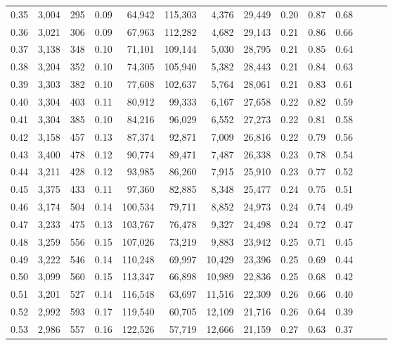 \begin{tabular}{rrrrrrrrrrrrrr}
0.35 &  3,004 &    295 &  0.09 &   64,942 &  115,303 &   4,376 &  29,449 &  0.20 &  0.87 &      0.68 \\
0.36 &  3,021 &    306 &  0.09 &   67,963 &  112,282 &   4,682 &  29,143 &  0.21 &  0.86 &      0.66 \\
0.37 &  3,138 &    348 &  0.10 &   71,101 &  109,144 &   5,030 &  28,795 &  0.21 &  0.85 &      0.64 \\
0.38 &  3,204 &    352 &  0.10 &   74,305 &  105,940 &   5,382 &  28,443 &  0.21 &  0.84 &      0.63 \\
0.39 &  3,303 &    382 &  0.10 &   77,608 &  102,637 &   5,764 &  28,061 &  0.21 &  0.83 &      0.61 \\
0.40 &  3,304 &    403 &  0.11 &   80,912 &   99,333 &   6,167 &  27,658 &  0.22 &  0.82 &      0.59 \\
0.41 &  3,304 &    385 &  0.10 &   84,216 &   96,029 &   6,552 &  27,273 &  0.22 &  0.81 &      0.58 \\
0.42 &  3,158 &    457 &  0.13 &   87,374 &   92,871 &   7,009 &  26,816 &  0.22 &  0.79 &      0.56 \\
0.43 &  3,400 &    478 &  0.12 &   90,774 &   89,471 &   7,487 &  26,338 &  0.23 &  0.78 &      0.54 \\
0.44 &  3,211 &    428 &  0.12 &   93,985 &   86,260 &   7,915 &  25,910 &  0.23 &  0.77 &      0.52 \\
0.45 &  3,375 &    433 &  0.11 &   97,360 &   82,885 &   8,348 &  25,477 &  0.24 &  0.75 &      0.51 \\
0.46 &  3,174 &    504 &  0.14 &  100,534 &   79,711 &   8,852 &  24,973 &  0.24 &  0.74 &      0.49 \\
0.47 &  3,233 &    475 &  0.13 &  103,767 &   76,478 &   9,327 &  24,498 &  0.24 &  0.72 &      0.47 \\
0.48 &  3,259 &    556 &  0.15 &  107,026 &   73,219 &   9,883 &  23,942 &  0.25 &  0.71 &      0.45 \\
0.49 &  3,222 &    546 &  0.14 &  110,248 &   69,997 &  10,429 &  23,396 &  0.25 &  0.69 &      0.44 \\
0.50 &  3,099 &    560 &  0.15 &  113,347 &   66,898 &  10,989 &  22,836 &  0.25 &  0.68 &      0.42 \\
0.51 &  3,201 &    527 &  0.14 &  116,548 &   63,697 &  11,516 &  22,309 &  0.26 &  0.66 &      0.40 \\
0.52 &  2,992 &    593 &  0.17 &  119,540 &   60,705 &  12,109 &  21,716 &  0.26 &  0.64 &      0.39 \\
0.53 &  2,986 &    557 &  0.16 &  122,526 &   57,719 &  12,666 &  21,159 &  0.27 &  0.63 &      0.37 \\

\end{tabular}
